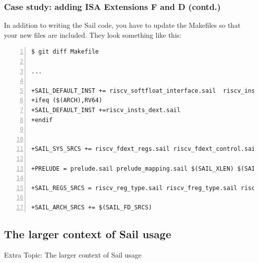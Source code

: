 \documentclass[aspectratio=169]{beamer}
\newcommand{\slidefont}{\scriptsize}
\begin{document}

\begin{frame}[fragile]
  \frametitle{Case study: adding ISA Extensions F and D (contd.)}

  \slidefont

  In addition to writing the Sail code, you have to update the
  Makefiles so that your new files are included.  They look something like this:

  \vspace{1ex}

  \begin{Verbatim}[frame=single, numbers=left, label = In your riscv-compliance repository clone]
$ git diff Makefile

...

+SAIL_DEFAULT_INST += riscv_softfloat_interface.sail  riscv_insts_fext.sail
+ifeq ($(ARCH),RV64)
+SAIL_DEFAULT_INST +=riscv_insts_dext.sail
+endif


+SAIL_SYS_SRCS += riscv_fdext_regs.sail riscv_fdext_control.sail

+PRELUDE = prelude.sail prelude_mapping.sail $(SAIL_XLEN) $(SAIL_FLEN) ...

+SAIL_REGS_SRCS = riscv_reg_type.sail riscv_freg_type.sail riscv_regs.sail ...

+SAIL_ARCH_SRCS += $(SAIL_FD_SRCS)
  \end{Verbatim}

\end{frame}


\subsection{The larger context of Sail usage}


\begin{frame}[fragile]

  \slidefont

  \vfill

  \begin{center}\LARGE
    Extra Topic: The larger context of Sail usage
  \end{center}

  \vfill

\end{frame}

\end{document}
